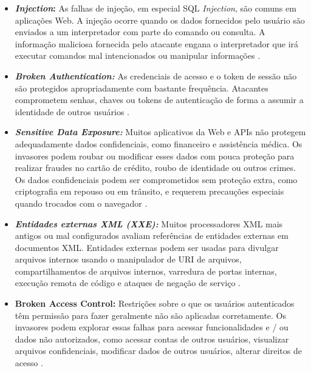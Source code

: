 \begin{itemize}
    
    \item \textbf{\textit{Injection}:} As falhas de injeção, em especial SQL \textit{Injection}, são comuns em aplicações Web. A injeção ocorre quando os dados fornecidos pelo usuário são enviados a um interpretador com parte do comando ou consulta. A informação maliciosa fornecida pelo atacante engana o interpretador que irá executar comandos mal intencionados ou manipular informações \cite{holanda2009segurancca}. 
       
    
    \item \textbf{\textit{Broken Authentication:}} As credenciais de acesso e o token de sessão não são protegidos apropriadamente com bastante frequência. Atacantes comprometem senhas, chaves ou tokens de autenticação de forma a assumir a identidade de outros usuários \cite{holanda2009segurancca}.
    
     \item \textbf{\textit{Sensitive Data Exposure:}} Muitos aplicativos da Web e APIs não protegem adequadamente dados confidenciais, como financeiro e assistência médica. Os invasores podem roubar ou modificar esses dados com pouca proteção para realizar fraudes no cartão de crédito, roubo de identidade ou outros crimes. Os dados confidenciais podem ser comprometidos sem proteção extra, como criptografia em repouso ou em trânsito, e requerem precauções especiais quando trocados com o navegador \cite{owasp}.
    
    \item \textbf{\textit{Entidades externas XML (XXE):}}  Muitos processadores XML mais antigos ou mal configurados avaliam referências de entidades externas em documentos XML. Entidades externas podem ser usadas para divulgar arquivos internos usando o manipulador de URI de arquivos, compartilhamentos de arquivos internos, varredura de portas internas, execução remota de código e ataques de negação de serviço \cite{owasp}.
    
    \item \textbf{Broken Access Control:}  Restrições sobre o que os usuários autenticados têm permissão para fazer geralmente não são aplicadas corretamente. Os invasores podem explorar essas falhas para acessar funcionalidades e / ou dados não autorizados, como acessar contas de outros usuários, visualizar arquivos confidenciais, modificar dados de outros usuários, alterar direitos de acesso \cite{owasp}.
    

\end{itemize}
